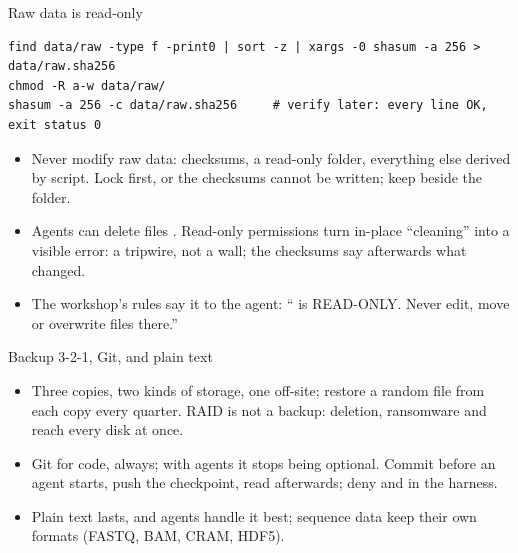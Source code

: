 \documentclass[11pt,aspectratio=169]{beamer}
\begin{document}
\begin{frame}[fragile]{Raw data is read-only}
\begin{lstlisting}[style=shell]
find data/raw -type f -print0 | sort -z | xargs -0 shasum -a 256 > data/raw.sha256
chmod -R a-w data/raw/
shasum -a 256 -c data/raw.sha256     # verify later: every line OK, exit status 0
\end{lstlisting}
  \small
  \begin{itemize}
    \item Never modify raw data: checksums, a read-only folder, everything
      else derived by script. Lock first, or the checksums cannot be written;
      keep  beside the folder.
    \item Agents can delete files \parencite{shapira2026agentsofchaos}.
      Read-only permissions turn in-place ``cleaning'' into a visible error:
      a tripwire, not a wall; the checksums say afterwards what changed.
    \item The workshop's rules say it to the agent: `` is
      READ-ONLY. Never edit, move or overwrite files there.''
  \end{itemize}
\end{frame}

\begin{frame}{Backup 3-2-1, Git, and plain text}
  \small
  \begin{itemize}
    \item Three copies, two kinds of storage, one off-site; restore a random
      file from each copy every quarter. RAID is not a backup: deletion,
      ransomware and  reach every disk at once.
    \item Git for code, always; with agents it stops being optional. Commit
      before an agent starts, push the checkpoint, read 
      afterwards; deny  and 
      in the harness.
    \item Plain text lasts, and agents handle it best; sequence data keep
      their own formats (FASTQ, BAM, CRAM, HDF5).
  \end{itemize}
\end{frame}
\end{document}
